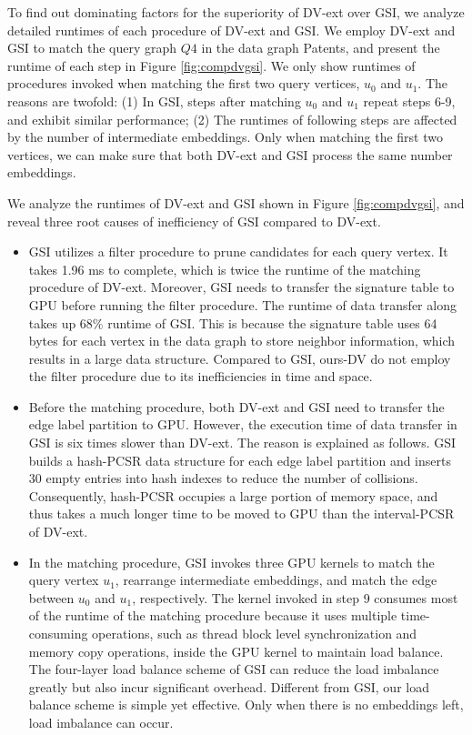 To find out dominating factors for the superiority of DV-ext over GSI, we analyze detailed runtimes of each procedure of DV-ext and GSI. We employ DV-ext and GSI to match the query graph $Q4$ in the data graph Patents, and present the runtime of each step in Figure \ref{fig:compdvgsi}. We only show runtimes of procedures invoked when matching the first two query vertices, $u_0$ and $u_1$. The reasons are twofold: (1) In GSI, steps after matching $u_0$ and $u_1$ repeat steps 6-9, and exhibit similar performance; (2) The runtimes of following steps are affected by the number of intermediate embeddings. Only when matching the first two vertices, we can make sure that both DV-ext and GSI process the same number embeddings.

We analyze the runtimes of DV-ext and GSI shown in Figure \ref{fig:compdvgsi}, and reveal three root causes of inefficiency of GSI compared to DV-ext.
\begin{itemize}
  \item GSI utilizes a filter procedure to prune candidates for each query vertex. It takes 1.96 ms to complete, which is twice the runtime of the matching procedure of DV-ext. Moreover, GSI needs to transfer the signature table to GPU before running the filter procedure. The runtime of data transfer along takes up 68\% runtime of GSI. This is because the signature table uses 64 bytes for each vertex in the data graph to store neighbor information, which results in a large data structure. Compared to GSI, ours-DV do not employ the filter procedure due to its inefficiencies in time and space.
  \item Before the matching procedure, both DV-ext and GSI need to transfer the edge label partition to GPU. However, the execution time of data transfer in GSI is six times slower than DV-ext. The reason is explained as follows. GSI builds a hash-PCSR data structure for each edge label partition and inserts 30 empty entries into hash indexes to reduce the number of collisions. Consequently, hash-PCSR occupies a large portion of memory space, and thus takes a much longer time to be moved to GPU than the interval-PCSR of DV-ext.
  \item In the matching procedure, GSI invokes three GPU kernels to match the query vertex $u_1$, rearrange intermediate embeddings, and match the edge between $u_0$ and $u_1$, respectively. The kernel invoked in step 9 consumes most of the runtime of the matching procedure because it uses multiple time-consuming operations, such as thread block level synchronization and memory copy operations, inside the GPU kernel to maintain load balance. The four-layer load balance scheme of GSI can reduce the load imbalance greatly but also incur significant overhead. Different from GSI, our load balance scheme is simple yet effective. Only when there is no embeddings left, load imbalance can occur.
\end{itemize}

